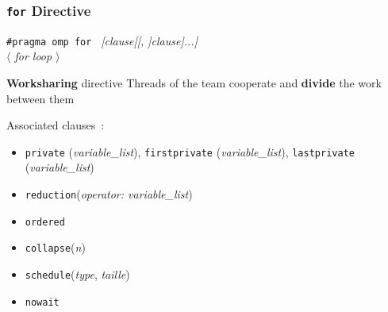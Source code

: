 \documentclass{beamer}
\begin{document}

\begin{frame}
  \frametitle{\texttt{for} Directive}
  
\begin{framed}
  {\tt \#pragma omp for } {\it  [clause[[, ]clause]...]}  \\
  {\it $\langle$ for loop $\rangle$} 
\end{framed}

\begin{alertblock}{\textbf{Worksharing} directive}
  Threads of the team cooperate and \textbf{divide} the work between them
\end{alertblock}

\medskip
  
Associated clauses~:
  \begin{itemize}
  \item  {\tt private} ({\it variable\_list}), {\tt firstprivate} ({\it variable\_list}), {\tt lastprivate} ({\it variable\_list})
  \item {\tt reduction}({\it operator: variable\_list})
  \item {\tt ordered}
  \item {\tt collapse}({\it n})
  \item {\tt  schedule}({\it type}, {\it taille})
  \item {\tt nowait}
  \end{itemize}
  
\end{frame}
\end{document}
